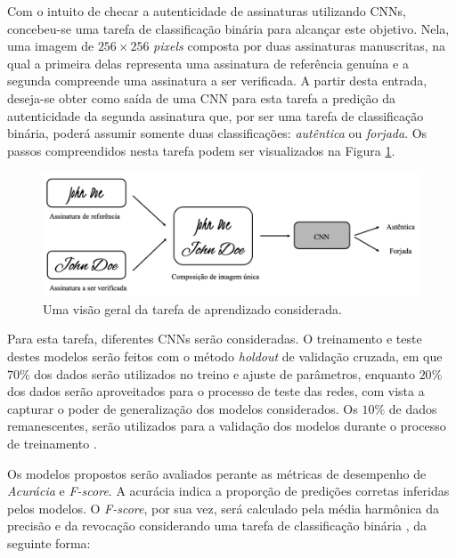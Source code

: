 


Com o intuito de checar a autenticidade de assinaturas utilizando CNNs, concebeu-se uma tarefa de classificação binária para alcançar este objetivo. Nela, uma imagem de $256 \times 256$ \emph{pixels} composta por duas assinaturas manuscritas, na qual a primeira delas representa uma assinatura de referência genuína e a segunda compreende uma assinatura a ser verificada. A partir desta entrada, deseja-se obter como saída de uma CNN para esta tarefa a predição da autenticidade da segunda assinatura que, por ser uma tarefa de classificação binária, poderá assumir somente duas classificações: \emph{autêntica} ou \emph{forjada}. Os passos compreendidos nesta tarefa podem ser visualizados na Figura \ref{fig:esquema-solucao}.

\begin{figure}[h!]
  \centering
  \caption{Uma visão geral da tarefa de aprendizado considerada.}
  \label{fig:esquema-solucao}
  \includegraphics[width=\textwidth]{imgs/esquema-solucao}
\end{figure}

Para esta tarefa, diferentes CNNs serão consideradas. O treinamento e teste destes modelos serão feitos com o método \emph{holdout} de validação cruzada, em que $70\%$ dos dados serão utilizados no treino e ajuste de parâmetros, enquanto $20\%$ dos dados serão aproveitados para o processo de teste das redes, com vista a capturar o poder de generalização dos modelos considerados. Os $10\%$ de dados remanescentes, serão utilizados para a validação dos modelos durante o processo de treinamento \cite{brink}.

Os modelos propostos serão avaliados perante as métricas de desempenho de \emph{Acurácia} e \emph{F-score}. A acurácia indica a proporção de predições corretas inferidas pelos modelos. O \emph{F-score}, por sua vez, será calculado pela média harmônica da precisão e da revocação considerando uma tarefa de classificação binária \cite{marsland}, da seguinte forma:

